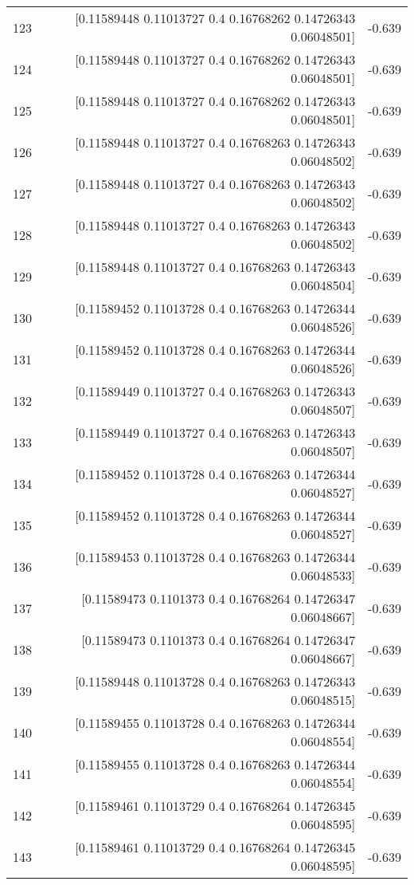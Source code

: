 \begin{longtable}{lrr}
123 & [0.11589448 0.11013727 0.4        0.16768262 0.14726343 0.06048501] & -0.639 \\
124 & [0.11589448 0.11013727 0.4        0.16768262 0.14726343 0.06048501] & -0.639 \\
125 & [0.11589448 0.11013727 0.4        0.16768262 0.14726343 0.06048501] & -0.639 \\
126 & [0.11589448 0.11013727 0.4        0.16768263 0.14726343 0.06048502] & -0.639 \\
127 & [0.11589448 0.11013727 0.4        0.16768263 0.14726343 0.06048502] & -0.639 \\
128 & [0.11589448 0.11013727 0.4        0.16768263 0.14726343 0.06048502] & -0.639 \\
129 & [0.11589448 0.11013727 0.4        0.16768263 0.14726343 0.06048504] & -0.639 \\
130 & [0.11589452 0.11013728 0.4        0.16768263 0.14726344 0.06048526] & -0.639 \\
131 & [0.11589452 0.11013728 0.4        0.16768263 0.14726344 0.06048526] & -0.639 \\
132 & [0.11589449 0.11013727 0.4        0.16768263 0.14726343 0.06048507] & -0.639 \\
133 & [0.11589449 0.11013727 0.4        0.16768263 0.14726343 0.06048507] & -0.639 \\
134 & [0.11589452 0.11013728 0.4        0.16768263 0.14726344 0.06048527] & -0.639 \\
135 & [0.11589452 0.11013728 0.4        0.16768263 0.14726344 0.06048527] & -0.639 \\
136 & [0.11589453 0.11013728 0.4        0.16768263 0.14726344 0.06048533] & -0.639 \\
137 & [0.11589473 0.1101373  0.4        0.16768264 0.14726347 0.06048667] & -0.639 \\
138 & [0.11589473 0.1101373  0.4        0.16768264 0.14726347 0.06048667] & -0.639 \\
139 & [0.11589448 0.11013728 0.4        0.16768263 0.14726343 0.06048515] & -0.639 \\
140 & [0.11589455 0.11013728 0.4        0.16768263 0.14726344 0.06048554] & -0.639 \\
141 & [0.11589455 0.11013728 0.4        0.16768263 0.14726344 0.06048554] & -0.639 \\
142 & [0.11589461 0.11013729 0.4        0.16768264 0.14726345 0.06048595] & -0.639 \\
143 & [0.11589461 0.11013729 0.4        0.16768264 0.14726345 0.06048595] & -0.639 \\

\end{longtable}
